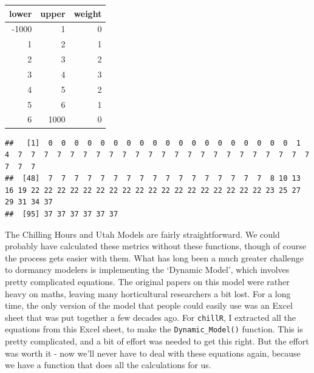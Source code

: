 \documentclass[
]{book}
\newenvironment{Shaded}{\begin{snugshade}}{\end{snugshade}}
\newcommand{\ControlFlowTok}[1]{\textcolor[rgb]{0.13,0.29,0.53}{\textbf{#1}}}
\newcommand{\DecValTok}[1]{\textcolor[rgb]{0.00,0.00,0.81}{#1}}
\newcommand{\KeywordTok}[1]{\textcolor[rgb]{0.13,0.29,0.53}{\textbf{#1}}}
\newcommand{\NormalTok}[1]{#1}
\newcommand{\OperatorTok}[1]{\textcolor[rgb]{0.81,0.36,0.00}{\textbf{#1}}}
\begin{document}
\begingroup\fontsize{10}{12}\selectfont

\begin{tabular}{r|r|r}
\hline
lower & upper & weight\\
\hline
-1000 & 1 & 0\\
\hline
1 & 2 & 1\\
\hline
2 & 3 & 2\\
\hline
3 & 4 & 3\\
\hline
4 & 5 & 2\\
\hline
5 & 6 & 1\\
\hline
6 & 1000 & 0\\
\hline
\end{tabular}
\endgroup{}

\begin{Shaded}
\end{Shaded}

\begin{verbatim}
##   [1]  0  0  0  0  0  0  0  0  0  0  0  0  0  0  0  0  0  0  0  1  4  7  7  7  7  7  7  7  7  7  7  7  7  7  7  7  7  7  7  7  7  7  7  7  7  7  7
##  [48]  7  7  7  7  7  7  7  7  7  7  7  7  7  7  7  7  7  8 10 13 16 19 22 22 22 22 22 22 22 22 22 22 22 22 22 22 22 22 22 22 23 25 27 29 31 34 37
##  [95] 37 37 37 37 37 37
\end{verbatim}

The Chilling Hours and Utah Models are fairly straightforward. We could probably have calculated these metrics without these functions, though of course the process gets easier with them. What has long been a much greater challenge to dormancy modelers is implementing the `Dynamic Model', which involves pretty complicated equations. The original papers on this model were rather heavy on maths, leaving many horticultural researchers a bit lost. For a long time, the only version of the model that people could easily use was an Excel sheet that was put together a few decades ago. For \texttt{chillR}, I extracted all the equations from this Excel sheet, to make the \texttt{Dynamic\_Model()} function. This is pretty complicated, and a bit of effort was needed to get this right. But the effort was worth it - now we'll never have to deal with these equations again, because we have a function that does all the calculations for us.
\end{document}
